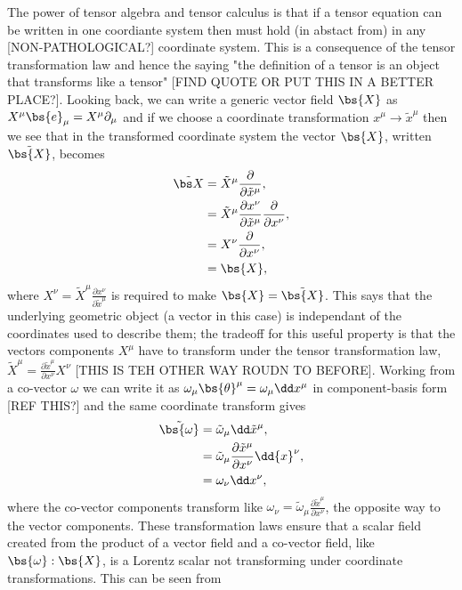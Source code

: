 The power of tensor algebra and tensor calculus is that if a tensor equation can be written in one coordiante system then must hold (in abstact from) in any [NON-PATHOLOGICAL?] coordinate system. This is a consequence of the tensor transformation law and hence the saying "the definition of a tensor is an object that transforms like a tensor" [FIND QUOTE OR PUT THIS IN A BETTER PLACE?]. Looking back, we can write a generic vector field $\bs{X}$ as $X^\mu \bs{e}_\mu = X^\mu \partial_\mu$ and if we choose a coordinate transformation $x^\mu \rightarrow \tilde{x}^\mu$ then we see that in the transformed coordinate system the vector $\bs{X}$, written $\tilde{\bs{X}}$, becomes
\begin{align}
\tilde{\bs X} &= \tilde{X}^\mu\frac{\partial}{\partial \tilde{x}^\mu}, \\
              &= \tilde{X}^\mu\frac{\partial x^\nu}{\partial \tilde{x}^\mu}\frac{\partial}{\partial {x}^\nu}, \\
              &= X^\nu \frac{\partial}{\partial x^\nu}, \\
              &= \bs{X}, \
\end{align}
where $X^\nu = \tilde{X}^\mu\frac{\partial x^\nu}{\partial \tilde{x}^\mu}$ is required to make $\bs{X}=\tilde{\bs{X}}$. This says that the underlying geometric object (a vector in this case) is independant of the coordinates used to describe them; the tradeoff for this useful property is that the vectors components $X^\mu$ have to transform under the tensor transformation law, $\tilde{X}^\mu = \frac{\partial \tilde{x}^\mu}{\partial x^\nu} X^\nu$ [THIS IS TEH OTHER WAY ROUDN TO BEFORE]. Working from a co-vector $\omega$ we can write it as $\omega_\mu \bs{\theta}^\mu = \omega_\mu \dd x^\mu$ in component-basis form [REF THIS?] and the same coordinate transform gives
\begin{align}
\tilde{\bs{\omega}} &= \tilde{\omega}_\mu \dd \tilde{x}^\mu , \\
                    &= \tilde{\omega}_\mu \frac{\partial \tilde{x}^\mu}{\partial x^\nu}\dd {x}^\nu , \\
                    &= \omega_\nu \dd x^\nu,
\end{align}
where the co-vector components transform like $\omega_\nu= \tilde{\omega}_\mu \frac{\partial \tilde{x}^\mu}{\partial x^\nu}$, the opposite way to the vector components. These transformation laws ensure that a scalar field created from the product of a vector field and a co-vector field, like $\bs{\omega}:\bs{X}$, is a Lorentz scalar not transforming under coordinate transformations. This can be seen from
